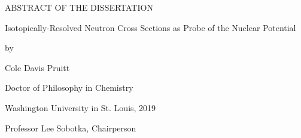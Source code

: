 \thispagestyle{plain}
\begin{center}

    ABSTRACT OF THE DISSERTATION

    Isotopically-Resolved Neutron Cross Sections as Probe of the Nuclear
    Potential

    \vspace{0.5 cm}

    by

    \vspace{0.2 cm}

    Cole Davis Pruitt

    \vspace{0.2 cm}

    Doctor of Philosophy in Chemistry

    \vspace{0.2 cm}

    Washington University in St. Louis, 2019

    \vspace{0.2cm}

    Professor Lee Sobotka, Chairperson
\end{center}

\vspace{1cm}


